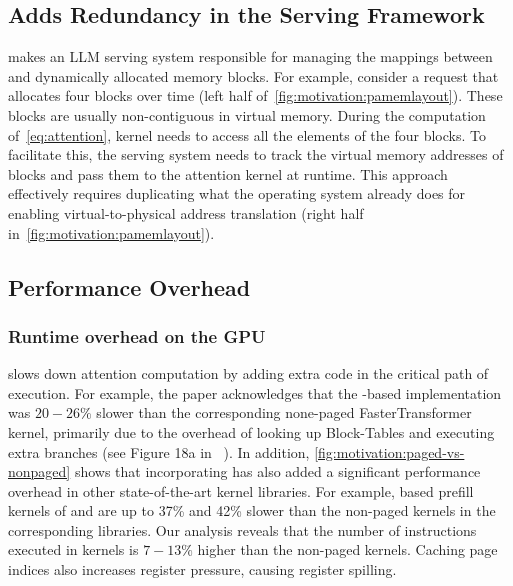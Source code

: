 \subsection{Adds Redundancy in the Serving Framework}
\label{subsec:blocktable}

\pa makes an LLM serving system responsible for managing the mappings between \kvcache and dynamically allocated memory blocks.
For example, consider a request that allocates four \kvcache blocks over time (left half of~\autoref{fig:motivation:pamemlayout}). These blocks are usually non-contiguous in virtual memory. During the computation of~\autoref{eq:attention}, \pa kernel needs to access all the elements of the four \kvcache blocks. To facilitate this, the serving system needs to track the virtual memory addresses of \kvcache blocks and pass them to the attention kernel at runtime. This approach effectively requires duplicating what the operating system already does for enabling virtual-to-physical address translation (right half in~\autoref{fig:motivation:pamemlayout}).





\subsection{Performance Overhead}
\label{sec:motivation:perfoverhead}


\subsubsection{Runtime overhead on the GPU}
\label{subsec:gpuperfoverhead}
\pa slows down attention computation by adding extra code in the critical path of execution. For example, the \vllm paper acknowledges that the \pa-based implementation was $20-26\%$ slower than the corresponding none-paged FasterTransformer kernel, primarily due to the overhead of looking up Block-Tables and executing extra branches (see Figure 18a in ~\cite{vllmsosp}). In addition, \autoref{fig:motivation:paged-vs-nonpaged} shows that incorporating \pa has also added a significant performance overhead in other state-of-the-art kernel libraries. For example, \pa based prefill kernels of \flashattention and \flashinfer are up to 37\% and 42\% slower than the non-paged kernels in the corresponding libraries. Our analysis reveals that the number of instructions executed in \pa kernels is $7-13\%$ higher than the non-paged kernels. Caching page indices also increases register pressure, causing register spilling.


